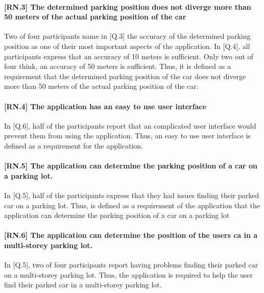 \paragraph{[RN.3] The determined parking position does not diverge more than 50 meters of the actual parking position of the car}
Two of four participants name in [Q.3] the accuracy of the determined parking position as one of their most important aspects of the application. In [Q.4], all participants express that an accuracy of 10 meters is sufficient. Only two out of four think, an accuracy of 50 meters is sufficient. Thus, it is defined as a requirement that the determined parking position of the car does not diverge more than 50 meters of the actual parking position of the car.


\paragraph{[RN.4] The application has an easy to use user interface}
In [Q.6], half of the participants report that an complicated user interface would prevent them from using the application. Thus, an easy to use user interface is defined as a requirement for the application.

\paragraph{[RN.5] The application can determine the parking position of a car on a parking lot.}
In [Q.5], half of the participants express that they had issues finding their parked car on a parking lot. Thus, is defined as a requirement of the application that the application can determine the parking position of a car on a parking lot


\paragraph{[RN.6] The application can determine the position of the users ca in a multi-storey parking lot.}
In [Q.5], two of four participants report having problems finding their parked car on a multi-storey parking lot. Thus, the application is required to help the user find their parked car in a multi-storey parking lot. 



